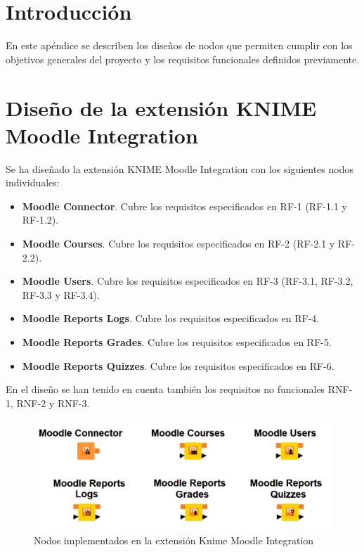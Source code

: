 
\section{Introducción}

En este apéndice se describen los diseños de nodos que permiten cumplir con los objetivos
 generales del proyecto y los requisitos funcionales definidos previamente. 

\section{Diseño de la extensión KNIME Moodle Integration}

Se ha diseñado la extensión KNIME Moodle Integration con los siguientes nodos individuales: 

\begin{itemize}
  \item \textbf{Moodle Connector}. Cubre los requisitos especificados en RF-1 (RF-1.1 y RF-1.2). 
  \item \textbf{Moodle Courses}. Cubre los requisitos especificados en RF-2 (RF-2.1 y RF-2.2).
  \item \textbf{Moodle Users}. Cubre los requisitos especificados en RF-3 (RF-3.1, RF-3.2, RF-3.3 y RF-3.4).
  \item \textbf{Moodle Reports Logs}. Cubre los requisitos especificados en RF-4. 
  \item \textbf{Moodle Reports Grades}. Cubre los requisitos especificados en RF-5. 
  \item \textbf{Moodle Reports Quizzes}. Cubre los requisitos especificados en RF-6. 
\end{itemize}

En el diseño se han tenido en cuenta también los requisitos no funcionales RNF-1, RNF-2 y RNF-3. 
\

\begin{figure}[!h]
	\centering
	\includegraphics[width=1\textwidth]{img/nodes_moodle_todos.png}
	\caption{Nodos implementados en la extensión Knime Moodle Integration}
	\label{fig:moodlenodesall}
\end{figure}
\FloatBarrier


